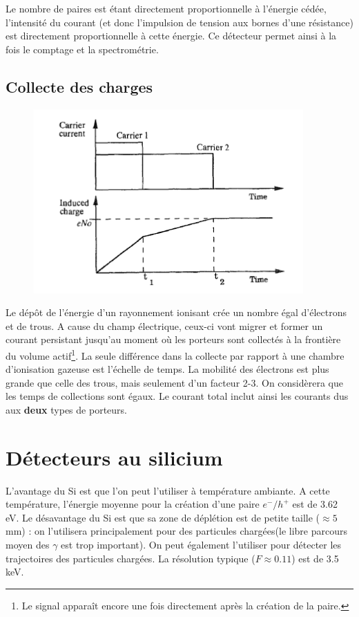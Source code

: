 Le nombre de paires est étant directement proportionnelle à l'énergie cédée, l'intensité du courant 
(et donc l'impulsion de tension aux bornes d'une résistance) est directement proportionnelle à cette
énergie. Ce détecteur permet ainsi à la fois le comptage et la spectrométrie.

\subsection{Collecte des charges}%
	\begin{figure}
	\vspace{-5mm}
	\includegraphics[scale=0.35]{ch9/image2}
	\end{figure}
Le dépôt de l'énergie d'un rayonnement ionisant crée un nombre égal d'électrons et de trous. A cause
du champ électrique, ceux-ci vont migrer et former un courant persistant jusqu'au moment où les 
porteurs sont collectés à la frontière du volume actif\footnote{Le signal apparaît encore une fois
directement après la création de la paire.}. La seule différence dans la collecte par 
rapport à une chambre d'ionisation gazeuse est l'échelle de temps. La mobilité des électrons est plus
grande que celle des trous, mais seulement d'un facteur 2-3. On considèrera que les temps de 
collections sont égaux. Le courant total inclut ainsi les courants dus aux \textbf{deux} types de
porteurs.

\section{Détecteurs au silicium}%
L'avantage du Si est que l'on peut l'utiliser à température ambiante. A cette température, 
l'énergie moyenne pour la création d'une paire $e^-/h^+$ est de 3.62 eV. Le désavantage du Si 
est que sa zone de déplétion est de petite taille ($\approx 5$ mm) : on l'utilisera principalement
pour des particules chargées(le libre parcours moyen des $\gamma$ est trop important). On peut 
également l'utiliser pour détecter les trajectoires des particules chargées. La résolution 
typique ($F\approx0.11$) est de 3.5 keV.

